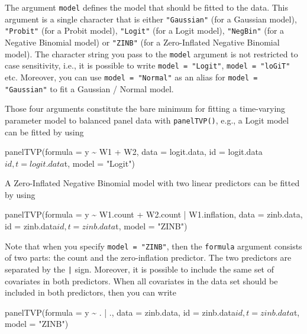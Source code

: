 \documentclass[a4paper, preprint, 3p,
authoryear]{elsarticle} %
\newenvironment{Shaded}{\begin{snugshade}}{\end{snugshade}}
\newcommand{\NormalTok}[1]{#1}
\begin{document}
The argument \texttt{model} defines the model that should be fitted to
the data. This argument is a single character that is either
\texttt{"Gaussian"} (for a Gaussian model), \texttt{"Probit"} (for a
Probit model), \texttt{"Logit"} (for a Logit model), \texttt{"NegBin"}
(for a Negative Binomial model) or \texttt{"ZINB"} (for a Zero-Inflated
Negative Binomial model). The character string you pass to the
\texttt{model} argument is not restricted to case sensitivity, i.e., it
is possible to write \texttt{model = "Logit"}, \texttt{model = "loGiT"}
etc. Moreover, you can use \texttt{model = "Normal"} as an alias for
\texttt{model = "Gaussian"} to fit a Gaussian / Normal model.

Those four arguments constitute the bare minimum for fitting a
time-varying parameter model to balanced panel data with
\texttt{panelTVP()}, e.g., a Logit model can be fitted by using

\begin{Shaded}
\begin{Highlighting}[]
\NormalTok{panelTVP(formula = y \textasciitilde{} W1 + W2,}
\NormalTok{         data = logit.data,}
\NormalTok{         id = logit.data$id,}
\NormalTok{         t = logit.data$t,}
\NormalTok{         model = "Logit")}
\end{Highlighting}
\end{Shaded}

A Zero-Inflated Negative Binomial model with two linear predictors can
be fitted by using

\begin{Shaded}
\begin{Highlighting}[]
\NormalTok{panelTVP(formula = y \textasciitilde{} W1.count + W2.count | W1.inflation,}
\NormalTok{         data = zinb.data,}
\NormalTok{         id = zinb.data$id,}
\NormalTok{         t = zinb.data$t,}
\NormalTok{         model = "ZINB")}
\end{Highlighting}
\end{Shaded}

Note that when you specify \texttt{model = "ZINB"}, then the
\texttt{formula} argument consists of two parts: the count and the
zero-inflation predictor. The two predictors are separated by the
\texttt{|} sign. Moreover, it is possible to include the same set of
covariates in both predictors. When all covariates in the data set
should be included in both predictors, then you can write

\begin{Shaded}
\begin{Highlighting}[]
\NormalTok{panelTVP(formula = y \textasciitilde{} . | .,}
\NormalTok{         data = zinb.data,}
\NormalTok{         id = zinb.data$id,}
\NormalTok{         t = zinb.data$t,}
\NormalTok{         model = "ZINB")}
\end{Highlighting}
\end{Shaded}
\end{document}
